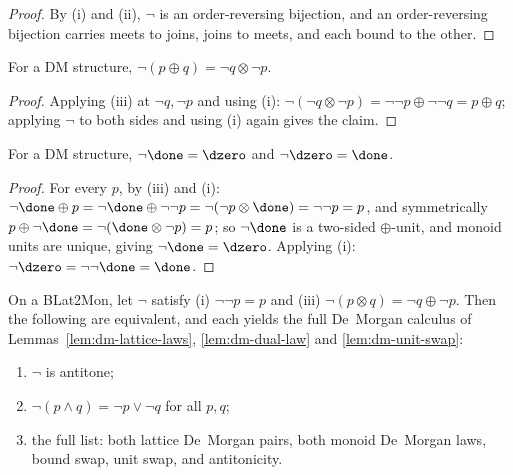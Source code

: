 \begin{proof}
\leanok
By (i) and (ii), $\neg$ is an order-reversing bijection, and an
order-reversing bijection carries meets to joins, joins to meets, and
each bound to the other.
\end{proof}

\begin{lemma}
\label{lem:dm-dual-law}
\leanok
For a DM structure, $\neg(p \oplus q) = \neg q \otimes \neg p$.
\end{lemma}

\begin{proof}
\leanok
Applying (iii) at $\neg q, \neg p$ and using (i):
$\neg(\neg q \otimes \neg p) = \neg\neg p \oplus \neg\neg q = p \oplus q$;
applying $\neg$ to both sides and using (i) again gives the claim.
\end{proof}

\begin{lemma}
\label{lem:dm-unit-swap}
\leanok
For a DM structure, $\neg\done = \dzero$ and $\neg\dzero = \done$.
\end{lemma}

\begin{proof}
\leanok
For every $p$, by (iii) and (i):
$\neg\done \oplus p = \neg\done \oplus \neg\neg p = \neg(\neg p \otimes \done)
= \neg\neg p = p$, and symmetrically
$p \oplus \neg\done = \neg(\done \otimes \neg p) = p$; so $\neg\done$ is a
two-sided $\oplus$-unit, and monoid units are unique, giving
$\neg\done = \dzero$. Applying (i): $\neg\dzero = \neg\neg\done =
\done$.
\end{proof}

\begin{theorem}
\label{thm:dm-presentations}
\leanok
On a BLat2Mon, let $\neg$ satisfy (i) $\neg\neg p = p$ and (iii)
$\neg(p \otimes q) = \neg q \oplus \neg p$. Then the following are
equivalent, and each yields the full De~Morgan calculus of
Lemmas~\ref{lem:dm-lattice-laws}, \ref{lem:dm-dual-law} and
\ref{lem:dm-unit-swap}:
\begin{enumerate}
\item[(a)] $\neg$ is antitone;
\item[(b)] $\neg(p \wedge q) = \neg p \vee \neg q$ for all $p, q$;
\item[(c)] the full list: both lattice De~Morgan pairs, both monoid
  De~Morgan laws, bound swap, unit swap, and antitonicity.
\end{enumerate}
\end{theorem}

